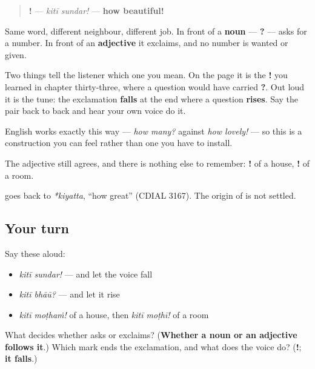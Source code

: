 \begin{quote}
\textbf{ !} — \emph{kitī sundar!} — \textbf{how beautiful!}
\end{quote}

Same word, different neighbour, different job. In front of a \textbf{noun} — \textbf{ ?} — \textbf{} asks for a number. In front of an \textbf{adjective} it exclaims, and no number is wanted or given.

Two things tell the listener which one you mean. On the page it is the \textbf{!} you learned in chapter thirty-three, where a question would have carried \textbf{?}. Out loud it is the tune: the exclamation \textbf{falls} at the end where a question \textbf{rises}. Say the pair back to back and hear your own voice do it.

English works exactly this way — \emph{how many?} against \emph{how lovely!} — so this is a construction you can feel rather than one you have to install.

The adjective still agrees, and there is nothing else to remember: \textbf{ !} of a house, \textbf{ !} of a room.

\begin{cousinweb}
\textbf{} goes back to \emph{*kiyatta}, \textquotedblleft{}how great\textquotedblright{} (CDIAL 3167). The origin of \textbf{} is not settled.
\end{cousinweb}

\subsection*{Your turn}
Say these aloud:

\begin{itemize}
\raggedright
  \item \emph{kitī sundar!} — and let the voice fall
  \item \emph{kitī bhāū?} — and let it rise
  \item \emph{kitī moṭhaṁ!} of a house, then \emph{kitī moṭhī!} of a room
\end{itemize}

\begin{tcolorbox}[breakable,colback=teal!4,colframe=teal!35!black,title={Before you move on}]
What decides whether \textbf{} asks or exclaims? (\textbf{Whether a noun or an adjective follows it}.) Which mark ends the exclamation, and what does the voice do? (\textbf{!}; \textbf{it falls}.)
\end{tcolorbox}
